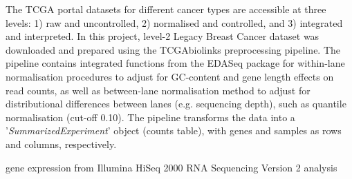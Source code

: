     The TCGA portal datasets for different cancer types are accessible at three levels: 1) raw and uncontrolled, 2) normalised and controlled, and 3) integrated and interpreted. In this project, level-2 Legacy Breast Cancer dataset was downloaded and prepared using the TCGAbiolinks preprocessing pipeline. The pipeline contains integrated functions from the EDASeq package \cite{risso2011gc} for within-lane normalisation procedures to adjust for GC-content and gene length effects on read counts, as well as between-lane normalisation method to adjust for distributional differences between lanes (e.g. sequencing depth), such as quantile normalisation (cut-off 0.10)\cite{Colaprico2016, PapaleoTCGAPackages}.  The pipeline transforms the data into a '\textit{SummarizedExperiment}' \cite{Huber2015OrchestratingBioconductor} object (counts table), with genes and samples as rows and columns, respectively. 
    
    
    
    
    
    gene expression from Illumina HiSeq 2000 RNA Sequencing Version 2 analysis
    
    







